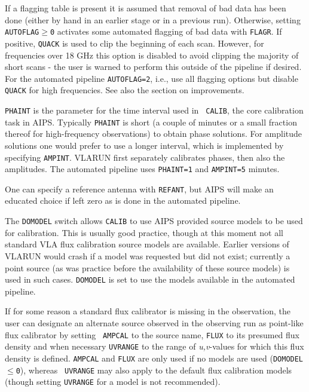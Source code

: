 If a flagging table is present it is assumed that removal of bad data
has been done (either by hand in an earlier stage or in a previous
run). Otherwise, setting {\tt AUTOFLAG$\ge$0} activates some automated flagging of
bad data with {\tt FLAGR}. If positive, {\tt QUACK} is used to clip
the beginning of each scan. However, for frequencies over 18 GHz this
option is disabled to avoid clipping the majority of short scans - the
user is warned to perform this outside of the pipeline if desired. For
the automated pipeline {\tt AUTOFLAG=2}, i.e., use all flagging options
but disable {\tt QUACK} for high frequencies.  See also the section on
improvements.

{\tt PHAINT} is the parameter for the time interval used in {\tt
CALIB}, the core calibration task in AIPS. Typically {\tt PHAINT} is
short (a couple of minutes or a small fraction thereof for
high-frequency observations) to obtain phase solutions. For amplitude
solutions one would prefer to use a longer interval, which is
implemented by specifying {\tt AMPINT}. VLARUN first separately
calibrates phases, then also the amplitudes.  The automated pipeline
uses {\tt PHAINT=1} and {\tt AMPINT=5} minutes.

One can specify a reference antenna with {\tt REFANT}, but AIPS will
make an educated choice if left zero as is done in the automated
pipeline.

The {\tt DOMODEL} switch allows {\tt CALIB} to use AIPS provided
source models to be used for calibration. This is usually good
practice, though at this moment not all standard VLA flux calibration
source models are available. Earlier versions of VLARUN would crash if
a model was requested but did not exist; currently a point source (as
was practice before the availability of these source models) is used
in such cases. {\tt DOMODEL} is set to use the models available in the
automated pipeline.

If for some reason a standard flux calibrator is missing in the
observation, the user can designate an alternate source observed in
the observing run as point-like flux calibrator by setting {\tt
AMPCAL} to the source name, {\tt FLUX} to its presumed flux density
and when necessary {\tt UVRANGE} to the range of {\it u,v}-values for
which this flux density is defined. {\tt AMPCAL} and {\tt FLUX} are
only used if no models are used ({\tt DOMODEL$\le$0}), whereas {\tt
UVRANGE} may also apply to the default flux calibration models (though
setting {\tt UVRANGE} for a model is not recommended).


